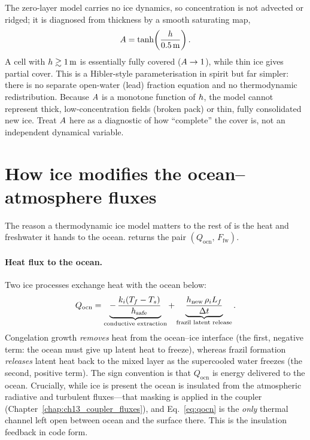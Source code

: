 The zero-layer model carries no ice dynamics, so concentration is not advected
or ridged; it is diagnosed from thickness by a smooth saturating map,
\begin{equation}
  A = \tanh\!\left(\frac{h}{0.5\,\mathrm{m}}\right).
  \label{eq:conc}
\end{equation}
A cell with $h\gtrsim 1\,\mathrm{m}$ is essentially fully covered
($A\to1$), while thin ice gives partial cover. This is a Hibler-style
parameterisation in spirit but far simpler: there is no separate open-water
(lead) fraction equation and no thermodynamic redistribution. Because $A$ is
a monotone function of $h$, the model cannot represent thick, low-concentration
fields (broken pack) or thin, fully consolidated new ice. Treat $A$ here as a
diagnostic of how ``complete'' the cover is, not an independent dynamical
variable.

\section{How ice modifies the ocean--atmosphere fluxes}

The reason a thermodynamic ice model matters to the rest of \model{} is the heat
and freshwater it hands to the ocean.  returns the pair
$(Q_{\mathrm{ocn}},\,F_{\mathrm{fw}})$.

\paragraph{Heat flux to the ocean.} Two ice processes exchange heat with the
ocean below:
\begin{equation}
  Q_{\mathrm{ocn}} = \underbrace{-\,\frac{k_{i}(T_{f}-T_{s})}{h_{\mathrm{safe}}}}
                        _{\text{conductive extraction}}
                   + \underbrace{\frac{h_{\mathrm{new}}\,\rho_{i} L_{f}}{\Delta t}}
                        _{\text{frazil latent release}}.
  \label{eq:qocn}
\end{equation}
Congelation growth \emph{removes} heat from the ocean--ice interface (the first,
negative term: the ocean must give up latent heat to freeze), whereas frazil
formation \emph{releases} latent heat back to the mixed layer as the supercooled
water freezes (the second, positive term). The sign convention is that
$Q_{\mathrm{ocn}}$ is energy delivered to the ocean. Crucially, while ice is
present the ocean is insulated from the atmospheric radiative and turbulent
fluxes---that masking is applied in the coupler
(Chapter~\ref{chap:ch13_coupler_fluxes}), and Eq.~\eqref{eq:qocn} is the
\emph{only} thermal channel left open between ocean and the surface there. This
is the insulation feedback in code form.

